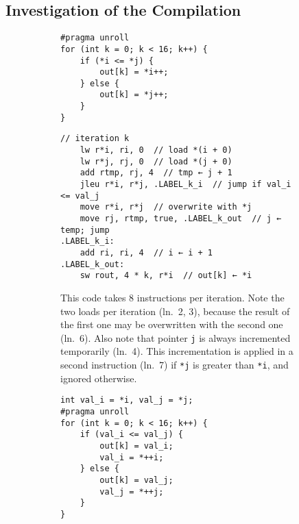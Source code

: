 \subsection*{Investigation of the Compilation}
\label{sec:tasklet:merge:compilation}

\begin{figure}
	\lstset{basicstyle=\ttfamily\small}
	\def\codewidth{0.34\linewidth}
	\def\assemblerwidth{0.61\linewidth}
	\begin{subfigure}{\textwidth}
		\begin{minipage}{\codewidth}
			\begin{lstlisting}[belowskip=3\baselineskip+\medskipamount]
#pragma unroll
for (int k = 0; k < 16; k++) {
	if (*i <= *j) {
		out[k] = *i++;
	} else {
		out[k] = *j++;
	}
}
			\end{lstlisting}
		\end{minipage}
		\hfill
		\begin{minipage}{\assemblerwidth}
			\begin{lstlisting}[language={[DPU]Assembler}]
// iteration k
	lw r*i, ri, 0  // load *(i + 0)
	lw r*j, rj, 0  // load *(j + 0)
	add rtmp, rj, 4  // tmp ← j + 1
	jleu r*i, r*j, .LABEL_k_i  // jump if val_i <= val_j
	move r*i, r*j  // overwrite with *j
	move rj, rtmp, true, .LABEL_k_out  // j ← temp; jump
.LABEL_k_i:
	add ri, ri, 4  // i ← i + 1
.LABEL_k_out:
	sw rout, 4 * k, r*i  // out[k] ← *i
			\end{lstlisting}
		\end{minipage}
		\caption{
			This code takes 8 instructions per iteration.
			Note the two loads per iteration (ln.~2, 3), because the result of the first one may be overwritten with the second one (ln.~6).
			Also note that pointer \lstinline|j| is always incremented temporarily (ln.~4).
			This incrementation is applied in a second instruction (ln.~7) if \lstinline|*j| is greater than \lstinline|*i|, and ignored otherwise.
		}
		\label{fig:merge:load:twice}
	\end{subfigure}
	\begin{subfigure}{\textwidth}
		\begin{minipage}{\codewidth}
			\begin{lstlisting}[belowskip=2\baselineskip+\medskipamount+\smallskipamount]
int val_i = *i, val_j = *j;
#pragma unroll
for (int k = 0; k < 16; k++) {
	if (val_i <= val_j) {
		out[k] = val_i;
		val_i = *++i;
	} else {
		out[k] = val_j;
		val_j = *++j;
	}
}
			\end{lstlisting}

\end{minipage}
\end{subfigure}
\end{figure}
